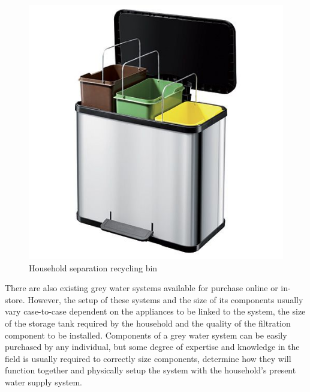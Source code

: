 \documentclass[a4paper,11pt,fleqn]{report}
\begin{document}
\begin{figure}[h!]
\begin{center}
\includegraphics[scale = 0.34]{HouseholdRecyclingBin.jpg}
\caption{Household separation recycling bin}
\label{fig: Household separation recycling bin}
\end{center}
\end{figure}

There are also existing grey water systems available for purchase online or in-store. However, the setup of these systems and the size of its components usually vary case-to-case dependent on the appliances to be linked to the system, the size of the storage tank required by the household and the quality of the filtration component to be installed. Components of a grey water system can be easily purchased by any individual, but some degree of expertise and knowledge in the field is usually required to correctly size components, determine how they will function together and physically setup the system with the household's present water supply system. 
\end{document}
